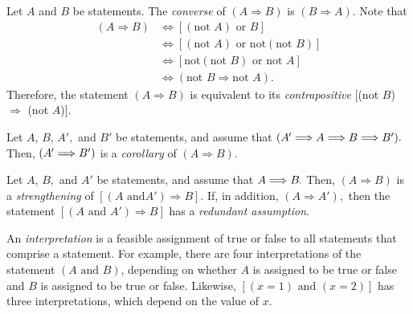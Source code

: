 Let $A$ and $B$ be statements.  The {\it converse}
%
of $(A\Longrightarrow B)$ is $(B \Longrightarrow A)$.
Note that
%
\begin{align*}
%
(A\Longrightarrow B) &\Longleftrightarrow [(\mbox{not }A)\mbox{ or } B]\\
%
&\Longleftrightarrow [(\mbox{not }A) \mbox{ or } \mbox{not}(\mbox{not }B)]\\
%
&\Longleftrightarrow [ \mbox{not}(\mbox{not }B) \mbox{ or } \mbox{not }A ]\\
%
%
&\Longleftrightarrow(\mbox{not }B\Longrightarrow \mbox{not }A).
%
\end{align*}
%
Therefore, the statement
$(A\Longrightarrow B)$ is equivalent to its {\it contrapositive}
%
[(not $B$)  $\Longrightarrow$ (not $A$)].


Let $A$, $B$, $A',$ and $B'$ be statements, and assume that $(A^{\mspace{-1mu}\prime}\Longrightarrow A \Longrightarrow B\Longrightarrow B^{\prime}).$ Then, $(A^{\mspace{-1mu}\prime}
\Longrightarrow B^{\prime})$ is a {\it corollary} of $(A\Longrightarrow
B).$

Let $A$, $B,$ and $A'$ be statements, and assume that
$A\Longrightarrow B\mspace{-1mu}.$ Then, $(A\Longrightarrow B)$ is a
{\it strengthening} of $[(A\mbox{ and
}A')\Longrightarrow B].$
%
%
If, in addition, $(A\Longrightarrow A'),$ then the
statement $[(A\mbox{ and }A')\Longrightarrow B]$ has a {\it redundant
assumption}.

An {\it interpretation} is a feasible assignment of true or false to all statements that comprise a statement.
For example, there are four interpretations of  the statement $(A\mbox{ and }B)$, depending on whether $A$ is assigned to be true or false and $B$ is assigned to be true or false.
%
Likewise, $[(x=1)\mbox{ and }(x=2)]$ has three interpretations, which depend on the value of $x.$





